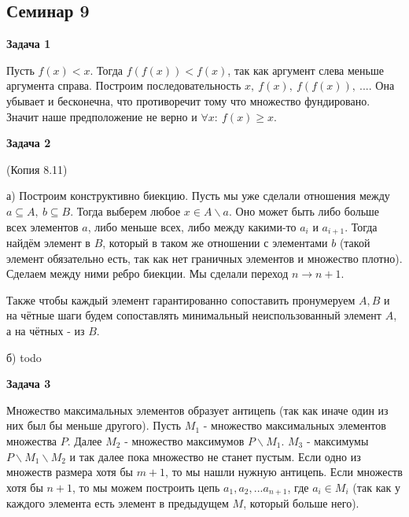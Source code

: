 \subsection{Семинар 9}
\begin{center}
\textbf{Задача 1}
\end{center}
Пусть $\displaystyle f( x) < x$. Тогда $\displaystyle f( f( x)) < f( x)$, так как аргумент слева меньше аргумента справа. Построим последовательность $\displaystyle x,\ f( x) ,\ f( f( x)) ,\ ...$. Она убывает и бесконечна, что противоречит тому что множество фундировано. Значит наше предположение не верно и $\displaystyle \forall x:\ f( x) \geqslant x$.

\begin{center}
\textbf{Задача 2}
\end{center}
(Копия 8.11)

а) Построим конструктивно биекцию. Пусть мы уже сделали отношения между $\displaystyle a\subseteq A,\ b\subseteq B$. Тогда выберем любое $\displaystyle x\in A\backslash a$. Оно может быть либо больше всех элементов $\displaystyle a$, либо меньше всех, либо между какими-то $\displaystyle a_{i}$ и $\displaystyle a_{i+1}$. Тогда найдём элемент в $\displaystyle B$, который в таком же отношении с элементами $\displaystyle b$ (такой элемент обязательно есть, так как нет граничных элементов и множество плотно). Сделаем между ними ребро биекции. Мы сделали переход $\displaystyle n\rightarrow n+1$.

Также чтобы каждый элемент гарантированно сопоставить пронумеруем $\displaystyle A,B$ и на чётные шаги будем сопоставлять минимальный неиспользованный элемент $\displaystyle A$, а на чётных - из $\displaystyle B$.

б) todo

\begin{center}
\textbf{Задача 3}
\end{center}
Множество максимальных элементов образует антицепь (так как иначе один из них был бы меньше другого). Пусть $\displaystyle M_{1}$ - множество максимальных элементов множества $\displaystyle P$. Далее $\displaystyle M_{2}$ - множество максимумов $\displaystyle P\backslash M_{1}$. $\displaystyle M_{3}$ - максимумы $\displaystyle P\backslash M_{1} \backslash M_{2}$ и так далее пока множество не станет пустым. Если одно из множеств размера хотя бы $\displaystyle m+1$, то мы нашли нужную антицепь. Если множеств хотя бы $\displaystyle n+1$, то мы можем построить цепь $\displaystyle a_{1} ,a_{2} ,...a_{n+1}$, где $\displaystyle a_{i} \in M_{i}$ (так как у каждого элемента есть элемент в предыдущем $\displaystyle M$, который больше него).

